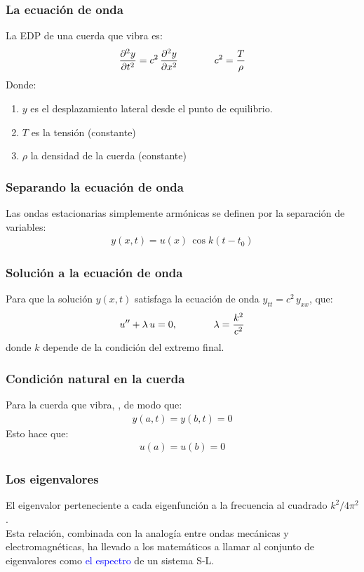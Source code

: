 \documentclass[12pt]{beamer}
\begin{document}
\begin{frame}
\frametitle{La ecuación de onda}
La EDP de una cuerda que vibra es:
\pause
\begin{align*}
\pdv[2]{y}{t} = c^{2} \, \pdv[2]{y}{x} \hspace{1.3cm} c^{2} = \dfrac{T}{\rho}
\end{align*}
\pause
Donde:
\begin{enumerate}[<+->]
\item $y$ es el desplazamiento lateral desde el punto de equilibrio.
\item $T$ es la tensión (constante)
\item $\rho$ la densidad de la cuerda (constante)
\end{enumerate}
\end{frame}
\begin{frame}
\frametitle{Separando la ecuación de onda}
Las ondas estacionarias simplemente armónicas se definen por la separación de variables:
\begin{align*}
y (x, t) = u (x) \, \cos k(t - t_{0})
\end{align*}
\end{frame}
\begin{frame}
\frametitle{Solución a la ecuación de onda}
Para que la solución $y (x, t)$ satisfaga la ecuación de onda $y_{tt} = c^{2} \, y_{xx}$, \pause {} que:
\begin{align*}
{u}^{\prime \prime} + \lambda \, u = 0, \hspace{1.3cm} \lambda = \dfrac{k^{2}}{c^{2}}
\end{align*}
donde $k$ depende de la condición del extremo final.
\end{frame}
\begin{frame}
\frametitle{Condición natural en la cuerda}
Para la cuerda que vibra, \pause {}, de modo que:
\pause
\begin{align*}
y (a, t) = y (b, t) = 0
\end{align*}
\pause
Esto hace que:
\begin{align*}
u (a) = u (b) = 0
\end{align*}
\end{frame}
\begin{frame}
\frametitle{Los eigenvalores}
El eigenvalor perteneciente a cada eigenfunción  a la frecuencia al cuadrado $k^{2}/4 \pi^{2}$.
\\
\bigskip
\pause
Esta relación, combinada con la analogía entre ondas mecánicas y electromagnéticas, ha llevado a los matemáticos a llamar al conjunto de eigenvalores como \textcolor{blue}{el espectro} de un sistema S-L.
\end{frame}
\end{document}
